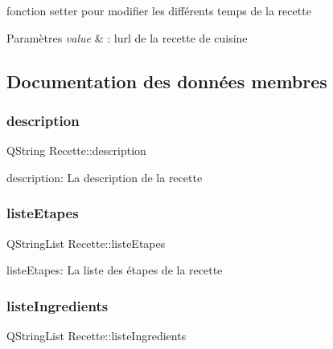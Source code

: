 fonction setter pour modifier les différents temps de la recette 


\begin{DoxyParams}{Paramètres}
{\em value} & \+: l\textquotesingle{}url de la recette de cuisine \\
\hline
\end{DoxyParams}


\subsection{Documentation des données membres}
\mbox{\label{classRecette_a140933cc7041efba084ccc66a6dc666a}} 
\subsubsection{\texorpdfstring{description}{description}}
{\footnotesize\ttfamily Q\+String Recette\+::description\hspace{0.3cm}{\ttfamily [private]}}

description\+: La description de la recette \mbox{\label{classRecette_addbf40a642849e6583ac7fd3e2059e0d}} 
\subsubsection{\texorpdfstring{liste\+Etapes}{listeEtapes}}
{\footnotesize\ttfamily Q\+String\+List Recette\+::liste\+Etapes\hspace{0.3cm}{\ttfamily [private]}}

liste\+Etapes\+: La liste des étapes de la recette \mbox{\label{classRecette_ab90a69f52a2250e1f49c4ac52b364adf}} 
\subsubsection{\texorpdfstring{liste\+Ingredients}{listeIngredients}}
{\footnotesize\ttfamily Q\+String\+List Recette\+::liste\+Ingredients\hspace{0.3cm}{\ttfamily [private]}}

